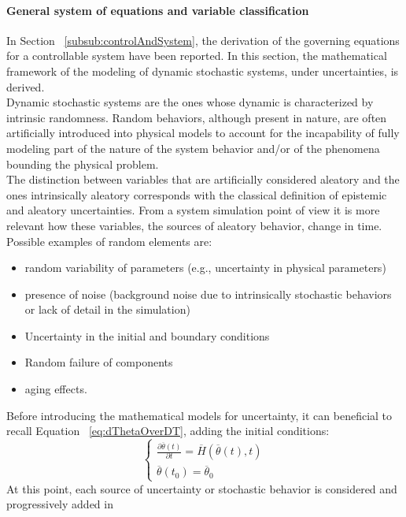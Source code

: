 \paragraph{General system of equations and variable classification}
In Section ~\ref{subsub:controlAndSystem}, the derivation of the governing equations for a controllable system
have been reported. In this section, the mathematical framework of the modeling of dynamic stochastic systems,
under uncertainties, is derived. 
\\ Dynamic stochastic systems are the ones whose dynamic is characterized by intrinsic randomness. Random 
behaviors, although present in nature, are often artificially introduced into physical models to account for the 
incapability of fully modeling part of the nature of the system behavior and/or of the phenomena bounding the
physical problem.
\\The distinction between variables that are artificially considered aleatory and the ones intrinsically aleatory 
corresponds with the classical definition of epistemic and aleatory uncertainties. From a 
system simulation point of view it is more relevant how these variables, the sources of aleatory behavior, change 
in time.
Possible examples of random elements are:
\begin{itemize}
 \item random variability of parameters (e.g., uncertainty in physical parameters)
 \item presence of noise (background noise due to intrinsically stochastic behaviors or lack of detail in the 
 simulation)
 \item Uncertainty in the initial and boundary conditions
 \item Random failure of components
 \item aging effects.
\end{itemize}
Before introducing the mathematical models for uncertainty,  it can beneficial to recall 
Equation ~\ref{eq:dThetaOverDT}, adding the initial conditions:
\begin{equation}
\label{eq:dThetaOverDTWithBoundary}
\left\{\begin{matrix}
\frac{\partial  \overline{\theta}\left ( t \right )}{\partial t}=\overline{H}\left (  \overline{\theta}\left ( t \right ),t \right ) \\ 
 \overline{\theta}\left ( t_{0} \right ) = \overline{\theta}_{0}
\end{matrix}\right.
\end{equation}
At this point, each source of uncertainty or stochastic behavior is considered and progressively added in 
